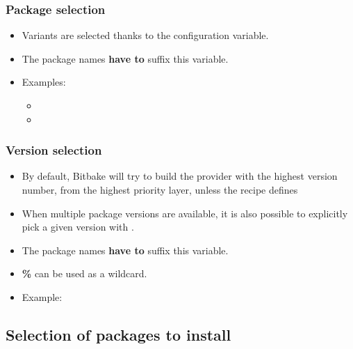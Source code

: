 \begin{frame}
  \frametitle{Package selection}
  \begin{itemize}
    \item Variants are selected thanks to the
       configuration variable.
    \item The package names {\bf have to} suffix this variable.
    \item Examples:
    \begin{itemize}
      \item {}
      \item {}
    \end{itemize}
  \end{itemize}
\end{frame}

\begin{frame}[fragile]
  \frametitle{Version selection}
  \begin{itemize}
    \item By default, Bitbake will try to build the provider with the
      highest version number, from the highest priority layer, unless the recipe defines
    \item When multiple package versions are available, it is also
      possible to explicitly pick a given version with
      .
    \item The package names {\bf have to} suffix this variable.
    \item {\bf \%} can be used as a wildcard.
    \item Example:
  \end{itemize}
\end{frame}

\subsection{Selection of packages to install}

